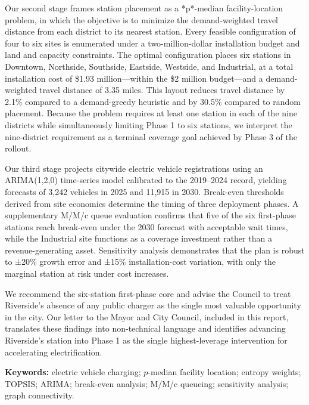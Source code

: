 \documentclass[11pt]{article}
\begin{document}
Our second stage frames station placement as a *p*-median facility-location problem, in which the objective is to minimize the demand-weighted travel distance from each district to its nearest station. Every feasible configuration of four to six sites is enumerated under a two-million-dollar installation budget and land and capacity constraints. The optimal configuration places six stations in Downtown, Northside, Southside, Eastside, Westside, and Industrial, at a total installation cost of \$1.93 million—within the \$2 million budget—and a demand-weighted travel distance of 3.35 miles. This layout reduces travel distance by 2.1\% compared to a demand-greedy heuristic and by 30.5\% compared to random placement. Because the problem requires at least one station in each of the nine districts while simultaneously limiting Phase 1 to six stations, we interpret the nine-district requirement as a terminal coverage goal achieved by Phase 3 of the rollout.

Our third stage projects citywide electric vehicle registrations using an ARIMA(1,2,0) time-series model calibrated to the 2019–2024 record, yielding forecasts of 3,242 vehicles in 2025 and 11,915 in 2030. Break-even thresholds derived from site economics determine the timing of three deployment phases. A supplementary M/M/c queue evaluation confirms that five of the six first-phase stations reach break-even under the 2030 forecast with acceptable wait times, while the Industrial site functions as a coverage investment rather than a revenue-generating asset. Sensitivity analysis demonstrates that the plan is robust to ±20\% growth error and ±15\% installation-cost variation, with only the marginal station at risk under cost increases.

We recommend the six-station first-phase core and advise the Council to treat Riverside's absence of any public charger as the single most valuable opportunity in the city. Our letter to the Mayor and City Council, included in this report, translates these findings into non-technical language and identifies advancing Riverside's station into Phase 1 as the single highest-leverage intervention for accelerating electrification.

\vspace{6pt}
\noindent\textbf{Keywords:} electric vehicle charging; $p$-median facility location; entropy weights; TOPSIS; ARIMA; break-even analysis; M/M/c queueing; sensitivity analysis; graph connectivity.

\newpage
\end{document}
